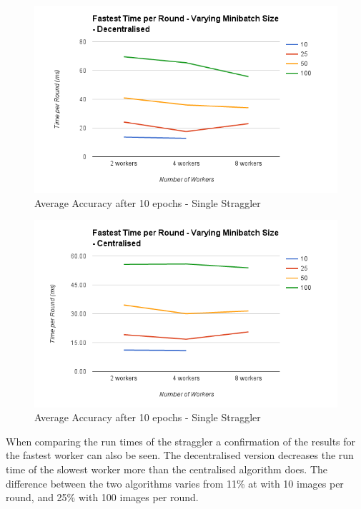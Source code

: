\documentclass[12pt]{article}
\begin{document}
\begin{figure}[H]
  \centering
  \includegraphics[width=6in]{FastestMinibatchDecentralised}
  \caption[]{Average Accuracy after 10 epochs - Single Straggler}
  \label{FastestMinibatchDecentralised}
\end{figure}

\begin{figure}[H]
  \centering
  \includegraphics[width=6in]{FastestMinibatchCentralised}
  \caption[]{Average Accuracy after 10 epochs - Single Straggler}
  \label{FastestMinibatchCentralised}
\end{figure}

When comparing the run times of the straggler a confirmation of the results for the fastest worker can also be seen. The decentralised version decreases the run time of the slowest worker more than the centralised algorithm does. The difference between the two algorithms varies from 11\% at with 10 images per round, and 25\% with 100 images per round.
\end{document}
